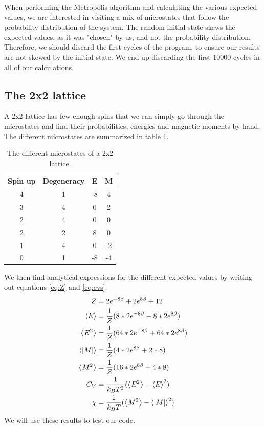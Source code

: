\documentclass[reprint,english,notitlepage]{revtex4-1}
\begin{document}
	When performing the Metropolis algorithm and calculating the various expected values, we are interested in visiting a mix of microstates that follow the probability distribution of the system. The random initial state skews the expected values, as it was "chosen" by us, and not the probability distribution. Therefore, we should discard the first cycles of the program, to ensure our results are not skewed by the initial state. We end up discarding the first 10000 cycles in all of our calculations.
	
\subsection{The 2x2 lattice}
	A 2x2 lattice has few enough spins that we can simply go through the microstates and find their probabilities, energies and magnetic moments by hand. The different microstates are summarized in table \ref{tab:2x2}.
	\begin{table}[H]
		\begin{center}
			\caption{The different microstates of a 2x2 lattice.}
			\label{tab:2x2}
			\begin{tabular}{|c|c|c|c|} \hline
				\textbf{Spin up} & \textbf{Degeneracy} & \textbf{E} & \textbf{M} \\ \hline
				4 & 1 & -8 & 4 \\
				3 & 4 & 0 & 2 \\
				2 & 4 & 0 & 0 \\
				2 & 2 & 8 & 0 \\
				1 & 4 & 0 & -2 \\
				0 & 1 & -8 & -4 \\ \hline
			\end{tabular}
		\end{center}
	\end{table}
	We then find analytical expressions for the different expected values by writing out equations \ref{eq:Z} and \ref{eq:evs}.
	\begin{equation}
	\label{eq:2x2}
	\begin{aligned}
		Z &= 2e^{-8\beta} + 2e^{8\beta} + 12 \\
		\expval{E} &= \frac{1}{Z} (8 * 2e^{-8\beta} - 8 * 2e^{8\beta}) \\
		\expval{E^2} &= \frac{1}{Z} (64 * 2e^{-8\beta} + 64 * 2e^{8\beta}) \\
		\expval{|M|} &= \frac{1}{Z} (4 * 2e^{8\beta} + 2 * 8) \\
		\expval{M^2} &= \frac{1}{Z} (16 * 2e^{8\beta} + 4 * 8) \\
		C_V &= \frac{1}{k_B T^2} (\expval{E^2} - \expval{E}^2) \\
		\chi &= \frac{1}{k_B T} (\expval{M^2} - \expval{|M|}^2)
	\end{aligned}
	\end{equation}
	We will use these results to test our code.
	
\end{document}
